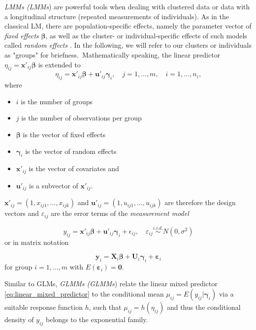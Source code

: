 \textit{\acl{LMM}s (\acs{LMM}s}) are powerful tools when dealing with clustered data or data with a longitudinal structure (repeated measurements of individuals).
As in the classical \acs{LM}, there are population-specific effects, namely the parameter vector of \textit{fixed effects} $\boldsymbol{\beta}$, as well as the cluster- or individual-specific effects of such models called \textit{random effects} \cite{fahrmeir2003regression}. In the following, we will refer to our clusters or individuals as "groups" for briefness.\ Mathematically speaking, the linear predictor $\eta_{ij}= \mathbf{x}'_{ij} \mathbf{\beta} $ is extended to
\begin{equation}
\eta_{ij} = \bm{{x'}}_{ij} \bm{\beta} + \bm{u'}_{ij}\bm{\gamma}_i, \quad j=1, \ldots, m, \quad i=1, \ldots, n_i, 
\label{eq:linear_mixed_predictor}
\end{equation}
where
\begin{itemize}
\item $i$ is the number of groups
\item $j$ is the number of observations per group
\item $\bm{\beta}$ is the vector of fixed effects
\item $\bm{\gamma}_i$ is the vector of random effects
\item $\bm{x'}_{ij}$ is the vector of covariates and
\item $\bm{u'}_{ij}$ is a subvector of $\bm{x'}_{ij}$.
\end{itemize}


$\bm{x'}_{ij} = (1, x_{ij1}, \ldots, x_{ijk}) $ and $ \bm{u'}_{ij} = (1, u_{ij1}, \ldots, u_{ijk}) $ are therefore the design vectors and $\varepsilon_{ij}$ are the error terms of the \textit{measurement model}

\begin{equation}
y_{ij} =  \bm{x'}_{ij} \bm{\beta} + \bm{u'}_{ij} \bm{\gamma}_i + \epsilon_{ij}, \quad \varepsilon_{i j} \overset{i.i.d.} \sim N\left(0, \sigma^{2}\right) 
\end{equation}
or in matrix notation

\begin{equation}
\bm{y}_{i}=\bm{X}_{i} \bm{\beta} + \bm{U}_{i} \bm{\gamma}_{i} + \bm{\varepsilon}_{i}
\end{equation}
for group $ i=1, \ldots, m $ with $ E(\bm{\varepsilon}_{i}) = \bm{0}$.

Similar to \acs{GLM}s, \textit{\acl{GLMM}s (\acs{GLMM}s}) relate the linear mixed predictor \ref{eq:linear_mixed_predictor} to the conditional mean 
$ \mu_{ij} = E(y_{ij} | \bm{\gamma}_{i}) $
via a suitable response function $h$, such that
$ \mu_{ij} = h(\eta_{ij}) $ and thus the conditional density of $y_{ij}$ belongs to the exponential family.